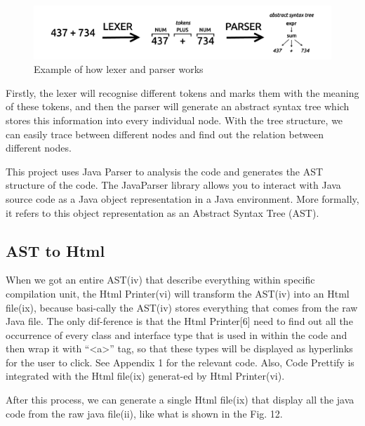 \documentclass[runningheads]{llncs}
\begin{document}
\begin{figure}[H]
	\centering
	\includegraphics[width=12cm]{pic/AST-Example.png}
	\caption{Example of how lexer and parser works\cite{parsing-in-java}}
	\label{Example of how lexer and parser works}
\end{figure}

Firstly, the lexer will recognise different tokens and marks them with the meaning of these tokens, and then the parser will generate an abstract syntax tree which stores this information into every individual node. With the tree structure, we can easily trace between different nodes and find out the relation between different nodes.

This project uses Java Parser to analysis the code and generates the AST structure of the code. The JavaParser library allows you to interact with Java source code as a Java
object representation in a Java environment. More formally, it refers to this object representation as an Abstract Syntax Tree (AST).\cite{smith_javaparser:_2016}

\subsection{AST to Html}

When we got an entire AST(iv) that describe everything within specific compilation unit, the Html Printer(vi) will transform the AST(iv) into an Html file(ix), because basi-cally the AST\cite{AST_introduction}(iv)  stores everything that comes from the raw Java file. The only dif-ference is that the Html Printer[6] need to find out all the occurrence of every class and interface type that is used in within the code and then wrap it with “<a>” tag, so that these types will be displayed as hyperlinks for the user to click. See Appendix 1 for the relevant code. Also, Code Prettify\cite{code-prettify} is integrated with the Html file(ix)  generat-ed by Html Printer(vi).

After this process, we can generate a single Html file(ix) that display all the java code from the raw java file(ii), like what is shown in the Fig. 12.
\end{document}
